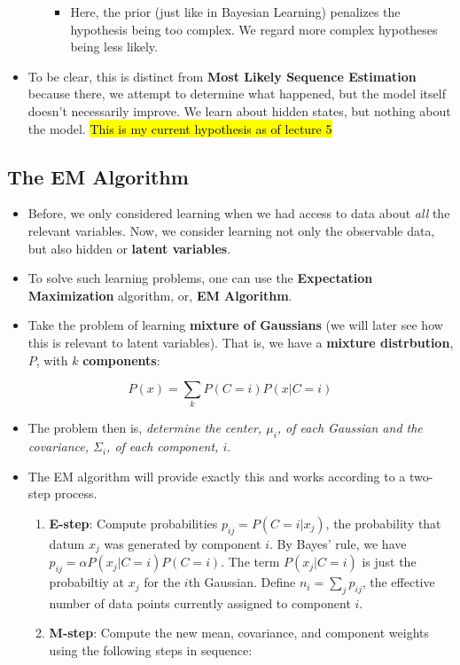 \documentclass[
]{book}
\providecommand{\tightlist}{%
  \setlength{\itemsep}{0pt}\setlength{\parskip}{0pt}}
\begin{document}
\begin{itemize}
\begin{enumerate}
    \begin{itemize}
    \tightlist
    \item
      Here, the prior (just like in Bayesian Learning) penalizes the
      hypothesis being too complex. We regard more complex hypotheses
      being less likely.
    \end{itemize}
  \end{enumerate}
\item
  To be clear, this is distinct from \textbf{Most Likely Sequence
  Estimation} because there, we attempt to determine what happened, but
  the model itself doesn't necessarily improve. We learn about hidden
  states, but nothing about the model. \hl{This is my current hypothesis
  as of lecture 5}
\end{itemize}

\hypertarget{the-em-algorithm}{%
\subsection{The EM Algorithm}\label{the-em-algorithm}}

\begin{itemize}
\item
  Before, we only considered learning when we had access to data about
  \emph{all} the relevant variables. Now, we consider learning not only
  the observable data, but also hidden or \textbf{latent variables}.
\item
  To solve such learning problems, one can use the \textbf{Expectation
  Maximization} algorithm, or, \textbf{EM Algorithm}.
\item
  Take the problem of learning \textbf{mixture of Gaussians} (we will
  later see how this is relevant to latent variables). That is, we have
  a \textbf{mixture distrbution}, \(P\), with \(k\) \textbf{components}:
\end{itemize}

\[
P(x) = \sum_k P(C=i)P(x|C=i)
\]

\begin{itemize}
\item
  The problem then is, \emph{determine the center, \(\mu_i\), of each
  Gaussian and the covariance, \(\Sigma_i\), of each component, \(i\)}.
\item
  The EM algorithm will provide exactly this and works according to a
  two-step process.

  \begin{enumerate}
  \def\labelenumi{\arabic{enumi}.}
  \tightlist
  \item
    \textbf{E-step}: Compute probabilities \(p_{ij} = P(C=i|x_j)\), the
    probability that datum \(x_j\) was generated by component \(i\). By
    Bayes' rule, we have \(p_{ij}=\alpha P(x_j|C=i)P(C=i)\). The term
    \(P(x_j|C=i)\) is just the probabiltiy at \(x_j\) for the \(i\)th
    Gaussian. Define \(n_i=\sum_j p_{ij}\), the effective number of data
    points currently assigned to component \(i\).
  \item
    \textbf{M-step}: Compute the new mean, covariance, and component
    weights using the following steps in sequence:
  \end{enumerate}
\end{itemize}
\end{document}
